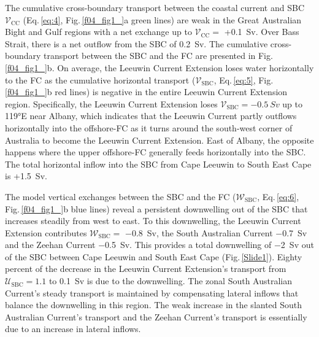 \documentclass[preprint,3p,review,12pt]{elsarticle}
\newcommand{\sub}[1]{_{\text{#1}}}
\begin{document}
\begin{figure}[p]
\end{figure}

The cumulative cross-boundary transport between the coastal current and SBC $\mathcal{V}\sub{CC}$ (Eq.\,\ref{eq:4}, Fig.\,\ref{f04_fig1_}a green lines) are weak in the Great Australian Bight and Gulf regions with a net exchange up to $\mathcal{V}\sub{CC} =$ +\SI{0.1}{Sv}. Over Bass Strait, there is a net outflow from the SBC of \SI{0.2}{Sv}. The cumulative cross-boundary transport between the SBC and the FC are presented in Fig.\,\ref{f04_fig1_}b.
On average, the Leeuwin Current Extension loses water horizontally to the FC as the cumulative horizontal transport ($\mathcal{V}\sub{SBC}$, Eq.\,\ref{eq:5}, Fig.\,\ref{f04_fig1_}b red lines) is negative in the entire Leeuwin Current Extension region. Specifically, the Leeuwin Current Extension loses $\mathcal{V}\sub{SBC} = \SI{-0.5}{Sv}$ up to \ang{119}E near Albany, which indicates
that the Leeuwin Current partly outflows horizontally into the offshore-FC as it turns around the south-west corner of Australia to become the Leeuwin Current Extension\@. East of Albany, the opposite happens where the upper offshore-FC generally feeds horizontally into the SBC\@. The total horizontal inflow into the SBC from Cape Leeuwin to South East Cape is +\SI{1.5}{Sv}.

The model vertical exchanges between the SBC and the FC ($\mathcal{W}\sub{SBC}$, Eq.\,\ref{eq:6}, Fig.\,\ref{f04_fig1_}b blue lines) reveal a persistent downwelling out of the SBC that increases steadily from west to east. To this downwelling, the Leeuwin Current Extension contributes $\mathcal{W}\sub{SBC} =$ \SI{-0.8}{Sv}, the South Australian Current \SI{-0.7}{Sv} and the Zeehan Current \SI{-0.5}{Sv}. This provides a total downwelling of \SI{-2}{Sv} out of the SBC between Cape Leeuwin and South East Cape (Fig.\,\ref{Slide1}).
Eighty percent of the decrease in the Leeuwin Current Extension's transport from
$\mathcal{U}\sub{SBC} = \num{1.1}$ to \SI{0.1}{Sv} is
due to the downwelling.
The zonal South Australian Current's steady transport is maintained by compensating lateral inflows that balance the downwelling in this region. The weak increase
in the slanted South Australian Current's transport and the Zeehan Current's transport is essentially due to an increase in lateral inflows.
\end{document}
